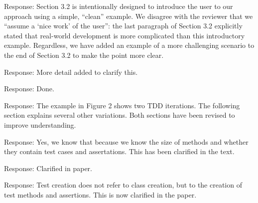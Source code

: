 \documentclass[11pt]{article}
\begin{document}
\noindent Response: Section 3.2 is intentionally designed to introduce the user to our approach using a simple, ``clean'' example.  We disagree with the reviewer that we ``assume a `nice work' of the user'': the last paragraph of Section 3.2 explicitly stated that real-world development is more complicated than this introductory example.   Regardless, we have added an example of a more challenging scenario to the end of Section 3.2 to make the point more clear. 



\noindent Response: More detail added to clarify this.


\noindent Response: Done.


\noindent Response: The example in Figure 2 shows two TDD iterations.  The following section explains several other variations.  Both sections have been revised to improve understanding. 


\noindent Response:  Yes, we know that because we know the size of methods and whether they contain test cases and assertations. This has been clarified in the text.


\noindent Response: Clarified in paper.


\noindent Response: Test creation does not refer to class creation,  but to the creation of test methods and assertions. This is now clarified in the paper.

\end{document}
